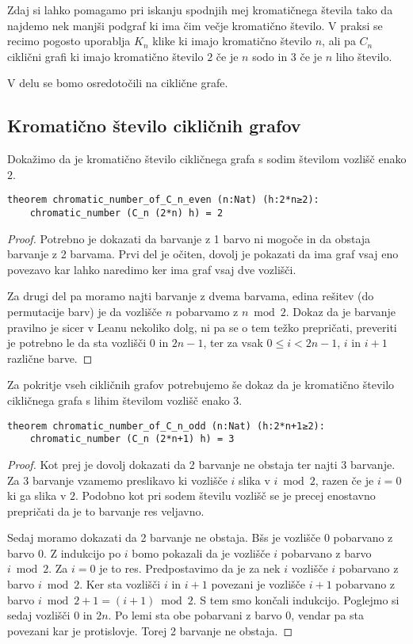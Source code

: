 \documentclass[mat1]{fmfdelo}
\begin{document}
Zdaj si lahko pomagamo pri iskanju spodnjih mej kromatičnega števila tako da najdemo nek manjši podgraf ki 
ima čim večje kromatično število. V praksi se recimo pogosto uporablja $K_n$ klike ki imajo kromatično število $n$, 
ali pa $C_n$ ciklični grafi ki imajo kromatično število $2$ če je $n$ sodo in $3$ če je $n$ liho število.

V delu se bomo osredotočili na ciklične grafe.

\subsection{Kromatično število cikličnih grafov}
Dokažimo da je kromatično število cikličnega grafa s sodim številom vozlišč enako $2$.
\begin{lstlisting}
theorem chromatic_number_of_C_n_even (n:Nat) (h:2*n≥2):
    chromatic_number (C_n (2*n) h) = 2
\end{lstlisting}
\begin{proof}
Potrebno je dokazati da barvanje z 1 barvo ni mogoče in da obstaja barvanje z 2 barvama.
Prvi del je očiten, dovolj je pokazati da ima graf vsaj eno povezavo kar lahko naredimo ker ima graf vsaj dve vozlišči.

Za drugi del pa moramo najti barvanje z dvema barvama, edina rešitev (do permutacije barv) je da vozlišče
$n$ pobarvamo z $n\bmod 2$. Dokaz da je barvanje pravilno je sicer v Leanu nekoliko dolg, ni pa se o tem
težko prepričati, preveriti je potrebno le da sta vozlišči $0$ in $2n-1$, ter za vsak $0\le i<2n-1$, $i$ in $i+1$ različne barve.
\end{proof}

Za pokritje vseh cikličnih grafov potrebujemo še dokaz da je kromatično število cikličnega grafa s lihim številom vozlišč enako $3$.
\begin{lstlisting}
theorem chromatic_number_of_C_n_odd (n:Nat) (h:2*n+1≥2):
    chromatic_number (C_n (2*n+1) h) = 3
\end{lstlisting}
\begin{proof}
Kot prej je dovolj dokazati da 2 barvanje ne obstaja ter najti 3 barvanje. 
Za 3 barvanje vzamemo preslikavo ki vozlišče $i$ slika v $i\bmod 2$, razen če je $i=0$ ki ga slika v $2$.
Podobno kot pri sodem številu vozlišč se je precej enostavno prepričati da je to barvanje res veljavno. 

Sedaj moramo dokazati da 2 barvanje ne obstaja. Bšs je vozlišče $0$ pobarvano z barvo $0$.
Z indukcijo po $i$ bomo pokazali da je vozlišče $i$ pobarvano z barvo $i\bmod 2$.
Za $i=0$ je to res. Predpostavimo da je za nek $i$ vozlišče $i$ pobarvano z barvo $i\bmod 2$.
Ker sta vozlišči $i$ in $i+1$ povezani je vozlišče $i+1$ pobarvano z barvo $i\bmod 2 + 1 = (i+1)\bmod 2$.
S tem smo končali indukcijo.
Poglejmo si sedaj vozlišči $0$ in $2n$. Po lemi sta obe pobarvani z barvo $0$, vendar pa sta povezani kar je protislovje.
Torej 2 barvanje ne obstaja. 
\end{proof}
\end{document}
